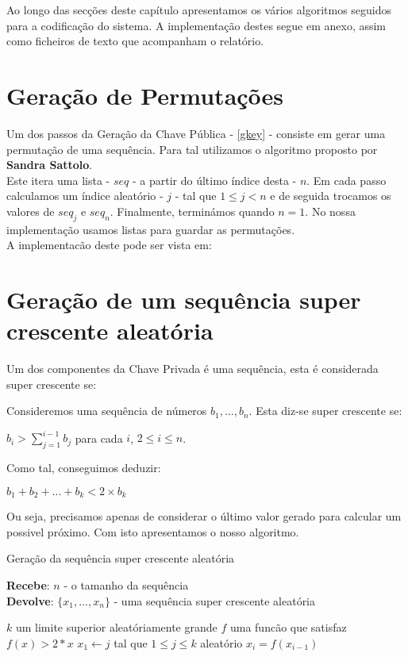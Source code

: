 \documentclass[11pt, language=portuguese]{report}
\begin{document}
Ao longo das secções deste capítulo apresentamos os vários algoritmos seguidos para a codificação do sistema.
A implementação destes segue em anexo, assim como ficheiros de texto que acompanham o relatório.

\section{Geração de Permutações}
\label{perm}

Um dos passos da Geração da Chave Pública - \ref{gkey} - consiste em gerar uma permutação de uma sequência. Para tal utilizamos o algoritmo proposto por \textbf{Sandra Sattolo}\autocite{sattolo}.\\
Este itera uma lista - $seq$ - a partir do último índice desta - $n$. Em cada passo calculamos um índice aleatório - $j$ - tal que $1 \le j < n$ e de seguida trocamos os valores de $seq_j$ e $seq_n$. Finalmente, terminámos quando $n = 1$. No nossa implementação usamos listas para guardar as permutações.\\
A implementacão deste pode ser vista em: 

\section{Geração de um sequência super crescente aleatória}
\label{seq}

Um dos componentes da Chave Privada é uma sequência, esta é considerada super crescente se:\\
\begin{definition}
	Consideremos uma sequência de números ${b_1, ..., b_n}$. Esta diz-se super crescente se:
	\begin{center}
		$b_i > \sum_{j = 1}^{i - 1} b_j$ para cada $i$, $2 \le i \le n$. 
	\end{center}
\end{definition}

Como tal, conseguimos deduzir:

\begin{center}
	$b_1 + b_2 + ... + b_k < 2 \times b_k$
\end{center}

Ou seja, precisamos apenas de considerar o último valor gerado para calcular um possivel próximo.
Com isto apresentamos o nosso algoritmo.
\begin{algorithm}[H]
	\caption{Geração da sequência super crescente aleatória}
	\textbf{Recebe}: $n$ - o tamanho da sequência\\
	\textbf{Devolve}: $\{x_1, ..., x_n\}$ - uma sequência super crescente aleatória
	\begin{algorithmic}[1]
		\State $k$ um limite superior aleatóriamente grande
		\State $f$ uma funcão que satisfaz $f(x) > 2 * x$
		\State $x_1 \gets j$ tal que $1 \le j \le k$ aleatório
			\State $x_i = f(x_{i-1})$
		\EndFor
	\end{algorithmic}
\end{algorithm}
\end{document}
